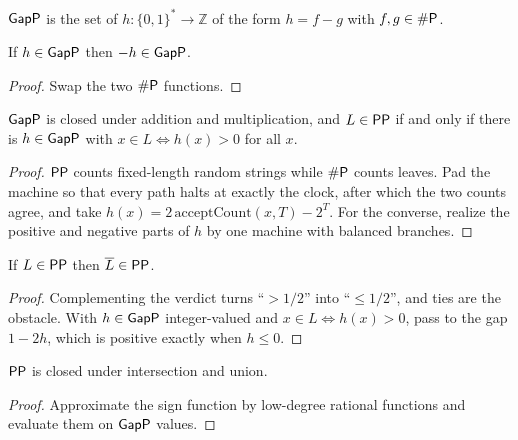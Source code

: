 \begin{definition}[$\cc{GapP}$]
  \label{def:randomness-gapp}
  \leanok
  $\cc{GapP}$ is the set of $h \colon \{0,1\}^* \to \mathbb{Z}$ of the form
  $h = f - g$ with $f, g \in \#\mathsf{P}$.
\end{definition}

\begin{proposition}
  \label{prop:randomness-gapp-neg}
  \leanok
  If $h \in \mathsf{GapP}$ then $-h \in \mathsf{GapP}$.
\end{proposition}
\begin{proof}
  \leanok
  Swap the two $\#\mathsf{P}$ functions.
\end{proof}

\begin{theorem}
  \label{thm:randomness-pp-gapp}
  $\cc{GapP}$ is closed under addition and multiplication, and
  $L \in \mathsf{PP}$ if and only if there is $h \in \mathsf{GapP}$ with
  $x \in L \iff h(x) > 0$ for all $x$.
\end{theorem}
\begin{proof}
  $\mathsf{PP}$ counts fixed-length random strings while $\#\mathsf{P}$ counts leaves.
  Pad the machine so that every path halts at exactly the clock, after which
  the two counts agree, and take $h(x) = 2\,\mathrm{acceptCount}(x, T) - 2^T$.
  For the converse, realize the positive and negative parts of $h$ by one
  machine with balanced branches.
\end{proof}

\begin{theorem}
  \label{thm:randomness-pp-compl}
  If $L \in \mathsf{PP}$ then $\overline{L} \in \mathsf{PP}$.
\end{theorem}
\begin{proof}
  Complementing the verdict turns ``$> 1/2$'' into ``$\le 1/2$'', and ties
  are the obstacle. With $h \in \mathsf{GapP}$ integer-valued and
  $x \in L \iff h(x) > 0$, pass to the gap $1 - 2h$, which is positive exactly
  when $h \le 0$.
\end{proof}

\begin{theorem}
  \label{thm:randomness-pp-intersection}
  $\mathsf{PP}$ is closed under intersection and union.
\end{theorem}
\begin{proof}
  Approximate the sign function by low-degree rational functions and evaluate
  them on $\cc{GapP}$ values.
\end{proof}

